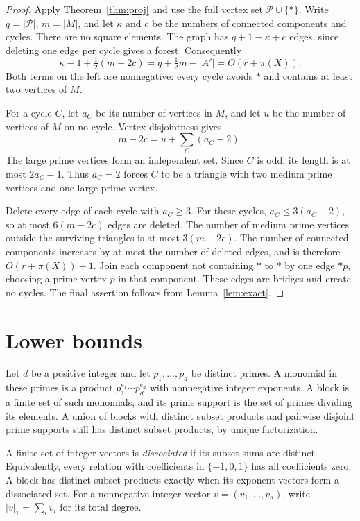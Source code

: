 \documentclass[11pt]{article}
\numberwithin{equation}{section}
\theoremstyle{remark}
\begin{document}
\begin{proof}
Apply Theorem~\ref{thm:proj} and use the full vertex set $\mathcal P\cup\{*\}$. Write $q=|\mathcal P|$, $m=|M|$, and let $\kappa$ and $c$ be the numbers of connected components and cycles. There are no square elements. The graph has $q+1-\kappa+c$ edges, since deleting one edge per cycle gives a forest. Consequently
\[
\kappa-1+\tfrac12(m-2c)=q+\tfrac12m-|A'|=O(r+\pi(X)).
\]
Both terms on the left are nonnegative: every cycle avoids $*$ and contains at least two vertices of $M$.

For a cycle $C$, let $a_C$ be its number of vertices in $M$, and let $u$ be the number of vertices of $M$ on no cycle. Vertex-disjointness gives
\[
m-2c=u+\sum_C(a_C-2).
\]
The large prime vertices form an independent set. Since $C$ is odd, its length is at most $2a_C-1$. Thus $a_C=2$ forces $C$ to be a triangle with two medium prime vertices and one large prime vertex.

Delete every edge of each cycle with $a_C\ge3$. For these cycles, $a_C\le3(a_C-2)$, so at most $6(m-2c)$ edges are deleted. The number of medium prime vertices outside the surviving triangles is at most $3(m-2c)$. The number of connected components increases by at most the number of deleted edges, and is therefore $O(r+\pi(X))+1$. Join each component not containing $*$ to $*$ by one edge $*p$, choosing a prime vertex $p$ in that component. These edges are bridges and create no cycles. The final assertion follows from Lemma~\ref{lem:exact}.
\end{proof}

\section{Lower bounds}\label{sec:lower}
Let $d$ be a positive integer and let $p_1,\dots,p_d$ be distinct primes. A monomial in these primes is a product $p_1^{e_1}\cdots p_d^{e_d}$ with nonnegative integer exponents. A block is a finite set of such monomials, and its prime support is the set of primes dividing its elements. A union of blocks with distinct subset products and pairwise disjoint prime supports still has distinct subset products, by unique factorization.

A finite set of integer vectors is \emph{dissociated} if its subset sums are distinct. Equivalently, every relation with coefficients in $\{-1,0,1\}$ has all coefficients zero. A block has distinct subset products exactly when its exponent vectors form a dissociated set. For a nonnegative integer vector $v=(v_1,\dots,v_d)$, write $|v|_1=\sum_iv_i$ for its total degree.
\end{document}
